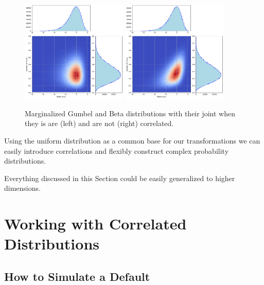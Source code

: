 \begin{ipython}
\end{ipython}

\begin{figure}[htbp]
\centering
\includegraphics[width=0.45\textwidth]{figures/gumbel_beta_uncorr}
\quad
\includegraphics[width=0.45\textwidth]{figures/gumbel_beta_corr}
\caption{Marginalized Gumbel and Beta distributions with their joint when they is are (left) and are not (right) correlated.}
\label{fig:gumbel_beta_with_corr}
\end{figure}
    
Using the uniform distribution as a common base for our transformations we can easily introduce correlations and flexibly construct complex probability distributions. 

Everything discussed in this Section could be easily generalized to higher dimensions.

\section{Working with Correlated Distributions}
\label{generate-correlated-distributions}

\subsection{How to Simulate a Default}


